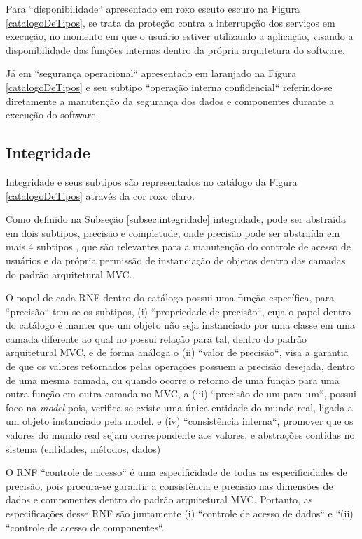 Para ``disponibilidade`` apresentado em roxo escuto escuro na Figura \ref{catalogoDeTipos}, se trata da proteção contra a interrupção dos serviços em execução, no momento em que o usuário estiver utilizando a aplicação, visando a disponibilidade das funções internas dentro da própria arquitetura do software. 

Já em ``segurança operacional`` apresentado em laranjado na Figura \ref{catalogoDeTipos} e seu subtipo ``operação interna confidencial`` referindo-se diretamente a manutenção da segurança dos dados e componentes durante a execução do software. 

\subsection{Integridade}

Integridade e seus subtipos são representados no catálogo da Figura \ref{catalogoDeTipos} através da cor roxo claro. 

Como definido na Subseção \ref{subsec:integridade} integridade, pode ser abstraída em dois subtipos, precisão e completude, onde precisão pode ser abstraída em mais 4 subtipos \cite{chung2012non}, que são relevantes para a manutenção do controle de acesso de usuários e da própria permissão de instanciação de objetos dentro das camadas do padrão arquitetural MVC. 

O papel de cada RNF dentro do catálogo possui uma função específica, para ``precisão`` tem-se os subtipos, (i) ``propriedade de precisão``, cuja o papel dentro do catálogo é manter que um objeto não seja instanciado por uma classe em uma camada diferente ao qual no possui relação para tal, dentro do padrão arquitetural MVC, e de forma análoga o (ii) ``valor de precisão``, visa a garantia de que os valores retornados pelas operações possuem a precisão desejada, dentro de uma mesma camada, ou quando ocorre o retorno de uma função para uma outra função em outra camada no MVC, a (iii) ``precisão de um para um``, possui foco na \textit{model} pois, verifica se existe uma única entidade do mundo real, ligada a um objeto instanciado pela model. e (iv) ``consistência interna``, promover que os valores do mundo real sejam correspondente aos valores, e abstrações contidas no sistema (entidades, métodos, dados)

O RNF ``controle de acesso`` é uma especificidade de todas as especificidades de precisão, pois procura-se garantir a consistência e precisão nas dimensões de dados e componentes dentro do padrão arquitetural MVC. Portanto, as especificações desse RNF são juntamente (i) ``controle de acesso de dados`` e ``(ii) ``controle de acesso de componentes``.

